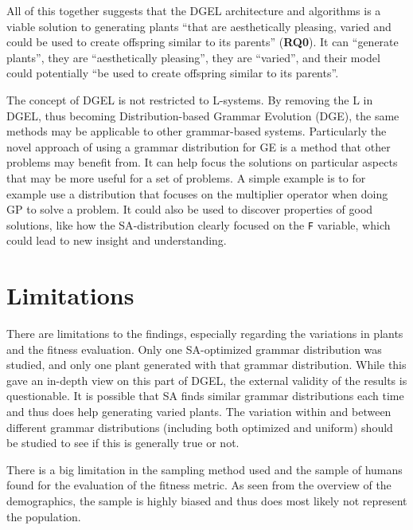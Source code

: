 All of this together suggests that the \gls{DGEL} architecture and algorithms is a viable solution to generating plants ``that are aesthetically pleasing, varied and could be used to create offspring similar to its parents'' (\textbf{RQ0}).
It can ``generate plants'', they are ``aesthetically pleasing'', they are ``varied'', and their model could potentially ``be used to create offspring similar to its parents''.

The concept of \gls{DGEL} is not restricted to \glspl{L-system}.
By removing the L in \gls{DGEL}, thus becoming Distribution-based Grammar Evolution (DGE), the same methods may be applicable to other grammar-based systems.
Particularly the novel approach of using a grammar distribution for \gls{GE} is a method that other problems may benefit from.
It can help focus the solutions on particular aspects that may be more useful for a set of problems.
A simple example is to for example use a distribution that focuses on the multiplier operator when doing \gls{GP} to solve a problem.
It could also be used to discover properties of good solutions, like how the \gls{SA}-distribution clearly focused on the \texttt{F} variable, which could lead to new insight and understanding.

\section{Limitations}
There are limitations to the findings, especially regarding the variations in plants and the fitness evaluation.
Only one \gls{SA}-optimized grammar distribution was studied, and only one plant generated with that grammar distribution.
While this gave an in-depth view on this part of \gls{DGEL}, the external validity of the results is questionable.
It is possible that \gls{SA} finds similar grammar distributions each time and thus does help generating varied plants.
The variation within and between different grammar distributions (including both optimized and uniform) should be studied to see if this is generally true or not.

There is a big limitation in the sampling method used and the sample of humans found for the evaluation of the fitness metric.
As seen from the overview of the demographics, the sample is highly biased and thus does most likely not represent the population.

